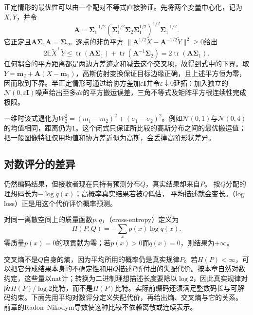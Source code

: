正定情形的最优性可以由一个配对不等式直接验证。先将两个变量中心化，记为\(\widetilde X,\widetilde Y\)，并令
\[
 \bm A=\bm\Sigma_1^{-1/2}
 (\bm\Sigma_1^{1/2}\bm\Sigma_2\bm\Sigma_1^{1/2})^{1/2}
 \bm\Sigma_1^{-1/2}.
\]
它正定且\(\bm A\bm\Sigma_1\bm A=\bm\Sigma_2\)。逐点的非负平方
\(\|\bm A^{1/2}\widetilde X-\bm A^{-1/2}\widetilde Y\|^2\geq0\)给出
\[
 2\mathbb E\widetilde X^\top\widetilde Y
 \leq\operatorname{tr}(\bm A\bm\Sigma_1)
    +\operatorname{tr}(\bm A^{-1}\bm\Sigma_2)
 =2\operatorname{tr}(\bm A\bm\Sigma_1).
\]
任何耦合的平方距离都是两边方差迹之和减去这个交叉项，故得到式中的下界。取\(Y=\bm m_2+\bm A(X-\bm m_1)\)，高斯仿射变换保证目标边缘正确，且上述平方恒为零，因而取到下界。半正定情形可通过给协方差加\(\varepsilon\bm I\)并令\(\varepsilon\downarrow0\)延拓：加入独立的\(\mathcal N(0,\varepsilon\bm I)\)噪声给出至多\(d\varepsilon\)的平方搬运误差，三角不等式及矩阵平方根连续性完成极限。

一维时该式退化为\(W_2^2=(m_1-m_2)^2+(\sigma_1-\sigma_2)^2\)。例如\(\mathcal N(0,1)\)与\(\mathcal N(0,4)\)的均值相同，距离仍为\(1\)。这个闭式只保证所比较的高斯分布之间的最优搬运值；把一般图像特征仅用均值和协方差近似为高斯，会丢掉高阶形状差异。

\subsection{对数评分的差异}
\label{sec:information-log-score-kl}

仍然编码结果，但接收者现在只持有预测分布\(Q\)，真实结果却来自\(P\)。
按\(Q\)分配的理想码长为\(-\log q(x)\)；高概率真实结果若被\(Q\)低估，
平均描述就会变长。（log loss）正是用这个代价评价概率预测。

\begin{definition}[离散交叉熵]
\label{def:information-cross-entropy}
对同一离散空间上的质量函数\(p,q\)，（cross-entropy）定义为
\begin{equation}
  H(P,Q)=-\sum_xp(x)\log q(x).
  \label{eq:information-cross-entropy}
\end{equation}
零质量\(p(x)=0\)的项贡献为零；若\(p(x)>0\)而\(q(x)=0\)，则结果为\(+\infty\)。
\end{definition}

交叉熵不是\(Q\)自身的熵，因为平均所用的概率仍是真实规律\(P\)。若\(H(P)<\infty\)，可以把它分成结果本身的不确定性和用\(Q\)描述\(P\)所付出的失配代价。按本章自然对数约定，这些量以nat计；转换为二进制理想描述长度要除以\(\log2\)，因此真实规律对应\(H(P)/\log2\)比特，而不是\(H(P)\)比特。实际前缀码还须满足整数码长与可解码约束。下面先用平均对数评分定义失配代价，再给出熵、交叉熵与它的关系。
前章的Radon--Nikodym导数使这种比较不依赖离散或连续表示。

